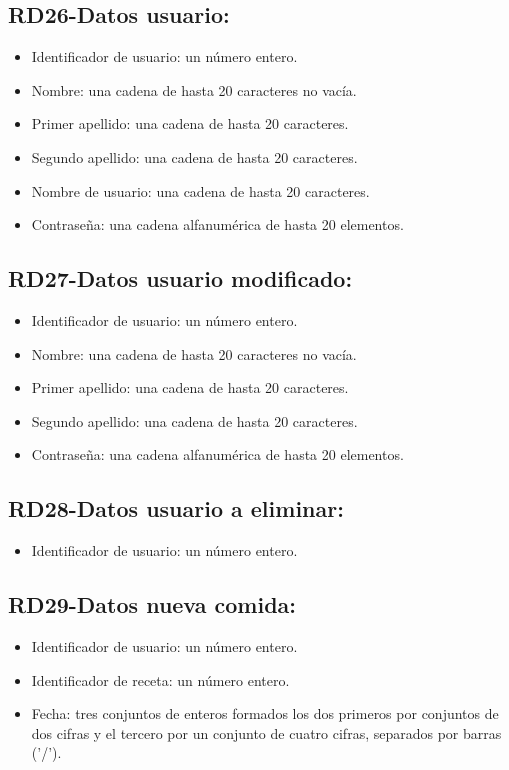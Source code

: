 \documentclass[a4paper,12pt]{report}
\begin{document}
\subsection{RD26-Datos usuario:}
\label{sec-2-1-26}
\begin{itemize}
\item Identificador de usuario: un número entero.
\item Nombre: una cadena de hasta 20 caracteres no vacía.
\item Primer apellido: una cadena de hasta 20 caracteres.
\item Segundo apellido: una cadena de hasta 20 caracteres.
\item Nombre de usuario: una cadena de hasta 20 caracteres.
\item Contraseña: una cadena alfanumérica de hasta 20 elementos.
\end{itemize}
\subsection{RD27-Datos usuario modificado:}
\label{sec-2-1-27}
\begin{itemize}
\item Identificador de usuario: un número entero.
\item Nombre: una cadena de hasta 20 caracteres no vacía.
\item Primer apellido: una cadena de hasta 20 caracteres.
\item Segundo apellido: una cadena de hasta 20 caracteres.
\item Contraseña: una cadena alfanumérica de hasta 20 elementos.
\end{itemize}

\subsection{RD28-Datos usuario a eliminar:}
\label{sec-2-1-28}
\begin{itemize}
\item Identificador de usuario: un número entero.
\end{itemize}
\subsection{RD29-Datos nueva comida:}
\label{sec-2-1-29}
\begin{itemize}
\item Identificador de usuario: un número entero.
\item Identificador de receta: un número entero.
\item Fecha: tres conjuntos de enteros formados los dos primeros por conjuntos de dos cifras y el                 tercero por un conjunto de cuatro cifras, separados por barras ('/').
\end{itemize}
\end{document}
